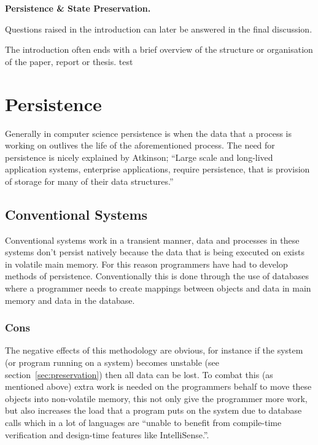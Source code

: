 \documentclass[a4,12pt]{article}
\newenvironment{boxit}{\begin{lrbox}{\savepar}
        \begin{minipage}[b]{4.6in}}
        {\end{minipage}\end{lrbox}\fbox{\usebox{\savepar}}}
\begin{document}
\begin{center}
\begin{boxit}
\textbf{Persistence \& State Preservation.}
\end{boxit}
\end{center}

Questions raised in the introduction can later be answered in the final discussion.

The introduction often ends with a brief overview of the structure or organisation of
the paper, report or thesis.
test~\citep{ADearle}
%
\section{Persistence}\label{sec:persistence}
Generally in computer science persistence is when the data that a process is working on outlives the life of the aforementioned  process. 
The need for persistence is nicely explained by Atkinson;
``Large scale and long-lived application systems, enterprise applications, require persistence, that is provision of storage for many of their data structures.''~\citep{persistenceandjava}

\subsection{Conventional Systems}
Conventional systems work in a transient manner, data and processes in these systems don't persist natively because the data that is being executed on exists in volatile main memory. For this reason programmers have had to develop methods of persistence. Conventionally this is done through the use of databases where a programmer needs to create mappings between objects and data in main memory and data in the database.
\subsubsection{Cons}\label{sec:cons}
The negative effects of this methodology are obvious, for instance if the system (or program running on a system) becomes unstable (see section~\ref{sec:preservation}) then all data can be lost. To combat this (as mentioned above) extra work is needed on the programmers behalf to move these objects into non-volatile memory, this not only give the programmer more work, but also increases the load that a program puts on the system due to database calls which in a lot of languages are ``unable to benefit from compile-time verification and design-time features like IntelliSense.''\citep{XML}.
\end{document}
